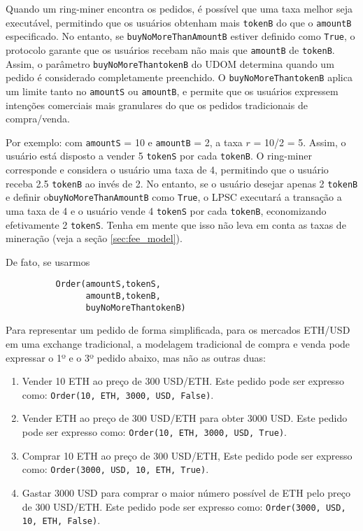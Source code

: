 \documentclass[UTF8,nofonts]{article}
\begin{document}
\begin{multicols}{2}
Quando um ring-miner encontra os pedidos, é possível que uma taxa melhor seja executável, permitindo que os usuários obtenham mais \verb|tokenB| do que o \verb|amountB| especificado. No entanto, se \verb|buyNoMoreThanAmountB| estiver definido como \verb|True|, o protocolo garante que os usuários recebam não mais que \verb|amountB| de \verb|tokenB|. Assim, o parâmetro \verb|buyNoMoreThantokenB| do UDOM determina quando um pedido é considerado completamente preenchido. O \verb|buyNoMoreThantokenB| aplica um limite tanto no \verb|amountS| ou \verb|amountB|, e permite que os usuários expressem intenções comerciais mais granulares do que os pedidos tradicionais de compra/venda.

Por exemplo: com \verb|amountS| = 10 e \verb|amountB| = 2, a taxa $r$ = 10/2 = 5.  Assim, o usuário está disposto a vender 5 \verb|tokenS| por cada \verb|tokenB|. O ring-miner corresponde e considera o usuário uma taxa de 4, permitindo que o usuário receba 2.5 \verb|tokenB| ao invés de 2. No entanto, se o usuário desejar apenas 2 \verb|tokenB| e definir o\verb|buyNoMoreThanAmountB| como  \verb|True|, o LPSC executará a transação a uma taxa de 4 e o usuário vende 4 \verb|tokenS| por cada \verb|tokenB|, economizando efetivamente 2 \verb|tokenS|. Tenha em mente que isso não leva em conta as taxas de mineração (veja a seção \ref{sec:fee_model}).

De fato, se usarmos


\begin{verbatim}
	      Order(amountS,tokenS,
	            amountB,tokenB,
	            buyNoMoreThantokenB)
\end{verbatim}

Para representar um pedido de forma simplificada, para os mercados ETH/USD em uma exchange tradicional, a modelagem tradicional de compra e venda pode expressar o 1º e o 3º pedido abaixo, mas não as outras duas:

\begin{enumerate}
	\item Vender 10 ETH ao preço de 300 USD/ETH. Este pedido pode ser expresso como: \verb|Order(10, ETH, 3000, USD, False)|.
	\item Vender ETH ao preço de 300 USD/ETH para obter 3000 USD. Este pedido pode ser expresso como: \verb|Order(10, ETH, 3000, USD, True)|.
	\item Comprar 10 ETH ao preço de 300 USD/ETH, Este pedido pode ser expresso como: \verb|Order(3000, USD, 10, ETH, True)|.
	\item Gastar 3000 USD para comprar o maior número possível de ETH pelo preço de 300 USD/ETH. Este pedido pode ser expresso como: \verb|Order(3000, USD, 10, ETH, False)|.
\end{enumerate}




\end{multicols}
\end{document}
